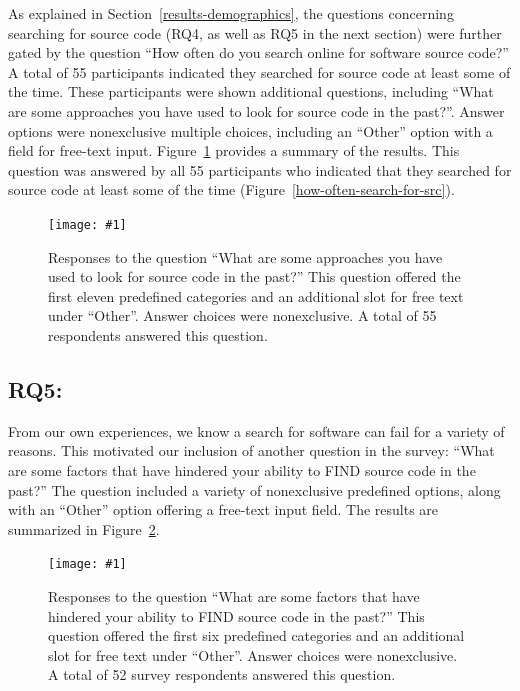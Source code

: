 \documentclass[review]{elsarticle}
\newcommand{\totalSearchers}{55\xspace}
\newcommand{\includefile}[1]{\texttt{[image: \#1]}}
\begin{document}
As explained in Section~\ref{results-demographics}, the questions concerning searching for source code (RQ4, as well as RQ5 in the next section) were further gated by the question ``How often do you search online for software source code?''  A total of \totalSearchers participants indicated they searched for source code at least some of the time.  These participants were shown additional questions, including ``What are some approaches you have used to look for source code in the past?''.    Answer options were nonexclusive multiple choices, including an ``Other'' option with a field for free-text input.  Figure~\ref{how-find-src} provides a summary of the results.  This question was answered by all \totalSearchers participants who indicated that they searched for source code at least some of the time (Figure~\ref{how-often-search-for-src}).

\begin{figure}[thb]
  \centering
  \includefile{files/plots/how-find-src.pdf}
  \caption{Responses to the question ``What are some approaches you have used to look for source code in the past?''  This question offered the first eleven predefined categories and an additional slot for free text under ``Other''.  Answer choices were nonexclusive.  A total of \totalSearchers respondents answered this question.}
  \label{how-find-src}
\end{figure}


\subsection{RQ5: \rqfivetext}
\label{results-rqfive}

From our own experiences, we know a search for software can fail for a variety of reasons.  This motivated our inclusion of another question in the survey: ``What are some factors that have hindered your ability to FIND source code in the past?''  The question included a variety of nonexclusive predefined options, along with an ``Other'' option offering a free-text input field.  The results are summarized in Figure~\ref{factors-that-hindered}.

\begin{figure}[hbt]
  \centering
  \includefile{files/plots/factors-that-hindered-finding-src.pdf}
  \caption{Responses to the question ``What are some factors that have hindered your ability to FIND source code in the past?'' This question offered the first six predefined categories and an additional slot for free text under ``Other''.  Answer choices were nonexclusive.  A total of 52 survey respondents answered this question.}
  \label{factors-that-hindered}
\end{figure}
\end{document}
